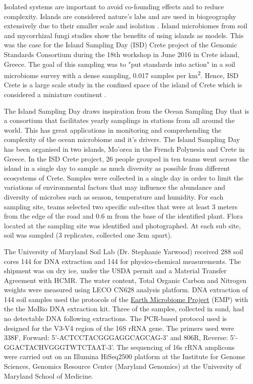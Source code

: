 Isolated systems are important to avoid co-founding effects and to reduce complexity.
Islands are considered nature's labs and are used in biogeography extensively due to their smaller scale and isolation \parencite{Whittaker2017}. 
Island microbiomes from soil \parencite{Li2020} and mycorrhizal fungi \parencite{Delavaux2021} studies
show the benefits of using islands as models.
This was the case for the Island Sampling Day (ISD) Crete project
of the Genomic Standards Consortium \parencite{Field2011}
during the 18th workshop in June 2016 in Crete island, Greece. The goal of this sampling was to "put standards into action"
in a soil microbiome survey with a dense sampling, 0.017 samples per km\textsuperscript{2}.
Hence, ISD Crete is a large scale study in the confined space of the island of Crete which 
is considered a miniature continent \parencite{Vogiatzakis2008_crete}.

The Island Sampling Day draws inspiration from the Ocean Sampling Day \parencite{kopf_2015} that is a
consortium that facilitates yearly samplings in stations from all around the world.
This has great applications in monitoring and comprehending the complexity of the ocean microbiome and it’s drivers.
The Island Sampling Day has been organised in two islands, Mo'orea in the French Polynesia and Crete in Greece.
In the ISD Crete project, 26 people grouped in ten teams went across the island
in a single day to sample as much diversity as possible from different ecosystems of Crete. 
Samples were collected in a single day in order to limit the variations of environmental
factors that may influence the abundance and diversity of microbes such as season,
temperature and humidity.
For each sampling site, teams selected two specific sub-sites that were
at least 3 meters from the edge of the road and 0.6 m from the base of
the identified plant. Flora located at the sampling site was
identified and photographed.
At each sub site, soil was sampled (3 replicates, collected one 3cm apart). 

The University of Maryland Soil Lab (Dr. Stephanie Yarwood) received 288 soil cores
144 for DNA extraction and 144 for physico-chemical measurements. The shipment was on dry ice,
under the USDA permit and a Material Transfer Agreement with HCMR.
The water content, Total Organic Carbon and Nitrogen weights were measured using LECO CN628 analysis platform.
DNA extraction of 144 soil samples used the protocols of the \href{https://www.protocols.io/view/emp-16s-illumina-amplicon-protocol-cpisvkee}{Earth Microbiome Project} (EMP)
with the the MoBio DNA extraction kit. Three of the samples, collected in sand, had no detectable DNA
following extractions.
The PCR-based protocol used is designed for the V3-V4 region of the 16S rRNA gene.
The primers used were 338F, Forward: 5'-ACTCCTACGGGAGGCAGCAG-3' and  806R, Reverse: 5'-GGACTACHVGGGTWTCTAAT-3'.
The sequencing of 16s rRNA amplicons were carried out on an Illumina HiSeq2500 platform
at the Institute for Genome Sciences, Genomics Resource Center (Maryland Genomics) at the University of Maryland School of Medicine.

